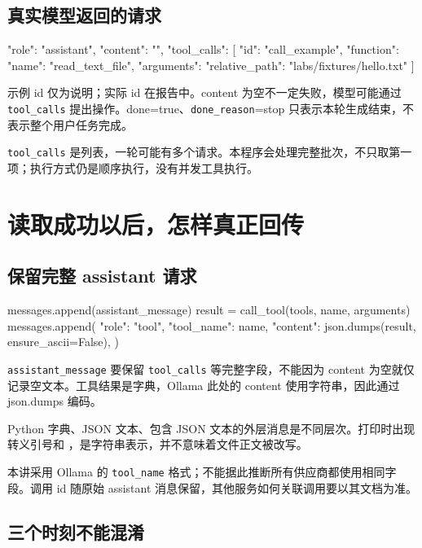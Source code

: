 \subsection{真实模型返回的请求}

\begin{Code}
{
  "role": "assistant",
  "content": "",
  "tool_calls": [{
    "id": "call_example",
    "function": {
      "name": "read_text_file",
      "arguments": {"relative_path": "labs/fixtures/hello.txt"}
    }
  }]
}
\end{Code}

示例 id 仅为说明；实际 id 在报告中。content 为空不一定失败，模型可能通过 \nolinkurl{tool_calls} 提出操作。done=true、\nolinkurl{done_reason}=stop 只表示本轮生成结束，不表示整个用户任务完成。

\nolinkurl{tool_calls} 是列表，一轮可能有多个请求。本程序会处理完整批次，不只取第一项；执行方式仍是顺序执行，没有并发工具执行。

\section{读取成功以后，怎样真正回传}

\subsection{保留完整 assistant 请求}

\begin{Code}
messages.append(assistant_message)
result = call_tool(tools, name, arguments)
messages.append({
    "role": "tool",
    "tool_name": name,
    "content": json.dumps(result, ensure_ascii=False),
})
\end{Code}

\nolinkurl{assistant_message} 要保留 \nolinkurl{tool_calls} 等完整字段，不能因为 content 为空就仅记录空文本。工具结果是字典，Ollama 此处的 content 使用字符串，因此通过 json.dumps 编码。

Python 字典、JSON 文本、包含 JSON 文本的外层消息是不同层次。打印时出现转义引号和 \code{\n}，是字符串表示，并不意味着文件正文被改写。

本讲采用 Ollama 的 \nolinkurl{tool_name} 格式；不能据此推断所有供应商都使用相同字段。调用 id 随原始 assistant 消息保留，其他服务如何关联调用要以其文档为准。

\subsection{三个时刻不能混淆}

